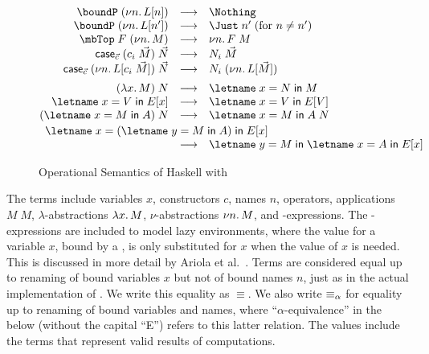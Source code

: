 \documentclass[natbib]{sigplanconf}
\begin{document}
\begin{figure}
\begin{small}
\begin{math}
\begin{array}{@{}c@{}}
\begin{array}{@{}rcl@{}}
\boundP\;(\nuabs{n}{\tctxt{L}{n}}) & \rrto & \Nothing\\

\boundP\;(\nuabs{n}{\tctxt{L}{n'}}) & \rrto & \Just\;n'\;\text{(for $n\not=n'$)}\\

\mbTop\;F\;(\nuabs{n}{M}) & \rrto & \nuabs{n}{F\;M}\\

\case\;(c_i\;\vec{M})\;\vec{N} & \rrto & N_i\;\vec{M}\\

\case\;(\nuabs{n}{\tctxt{L}{c_i\;\vec{M}}})\;\vec{N} & \rrto & N_i\;(\nuabs{n}{\tctxt{L}{\vec{M}}})

\\[5pt]

(\lamabsnot{x}{M})\;N & \rrto & \lete{x}{N}{M}\\

\lete{x}{V}{\tctxt{E}{x}} & \rrto & \lete{x}{V}{\tctxt{E}{V}}\\

(\lete{x}{M}{A})\;N & \rrto & \lete{x}{M}{A\;N}\\[2pt]

\multicolumn{3}{l}{
\lete{x}{(\lete{y}{M}{A})}{\tctxt{E}{x}}
}
\\
 & \rrto & \lete{y}{M}{\lete{x}{A}{\tctxt{E}{x}}}

\end{array}

\end{array}
\end{math}
\end{small}
\caption{Operational Semantics of Haskell with \ourlib}
\label{fig:opsem}
\end{figure}


The terms include variables $x$, constructors $c$, names $n$,
operators, applications $M\;M$, $\lambda$-abstractions
$\lambda x.\,M$, $\nu$-abstractions $\nu n.\,M$, and
-expressions. The -expressions are included to model
lazy environments, where the value for a variable $x$, bound by a
, is only substituted for $x$ when the value of $x$ is needed.
This is discussed in more detail by Ariola et al.~\cite{ariola95}.
Terms are considered equal up to renaming of bound variables $x$ but
not of bound names $n$, just as in the actual implementation of
\ourlib. We write this equality as $\equiv$. We also write $\equiv_{\alpha}$
for equality up to renaming of bound variables and names, where
``$\alpha$-equivalence'' in the below (without the capital ``E'')
refers to this latter relation.  The values include the
terms that represent valid results of computations.
\end{document}
